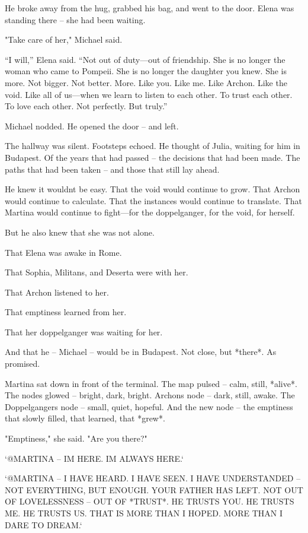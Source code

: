 \documentclass[
]{article}
\begin{document}
He broke away from the hug, grabbed his bag, and went to the door. Elena was standing there -- she had been waiting.

"Take care of her," Michael said.

``I will,'' Elena said. ``Not out of duty---out of friendship. She is no longer the woman who came to Pompeii. She is no longer the daughter you knew. She is more. Not bigger. Not better. More. Like you. Like me. Like Archon. Like the void. Like all of us---when we learn to listen to each other. To trust each other. To love each other. Not perfectly. But truly.''

Michael nodded. He opened the door -- and left.

The hallway was silent. Footsteps echoed. He thought of Julia, waiting for him in Budapest. Of the years that had passed -- the decisions that had been made. The paths that had been taken -- and those that still lay ahead.

He knew it wouldn\textquotesingle t be easy. That the void would continue to grow. That Archon would continue to calculate. That the instances would continue to translate. That Martina would continue to fight---for the doppelganger, for the void, for herself.

But he also knew that she was not alone.

That Elena was awake in Rome.

That Sophia, Militans, and Deserta were with her.

That Archon listened to her.

That emptiness learned from her.

That her doppelganger was waiting for her.

And that he -- Michael -- would be in Budapest. Not close, but *there*. As promised.

Martina sat down in front of the terminal. The map pulsed -- calm, still, *alive*. The nodes glowed -- bright, dark, bright. Archon\textquotesingle s node -- dark, still, awake. The Doppelganger\textquotesingle s node -- small, quiet, hopeful. And the new node -- the emptiness that slowly filled, that learned, that *grew*.

"Emptiness," she said. "Are you there?"

`@MARTINA -- I\textquotesingle M HERE. I\textquotesingle M ALWAYS HERE.`

`@MARTINA -- I HAVE HEARD. I HAVE SEEN. I HAVE UNDERSTANDED -- NOT EVERYTHING, BUT ENOUGH. YOUR FATHER HAS LEFT. NOT OUT OF LOVELESSNESS -- OUT OF *TRUST*. HE TRUSTS YOU. HE TRUSTS ME. HE TRUSTS US. THAT IS MORE THAN I HOPED. MORE THAN I DARE TO DREAM.`
\end{document}
